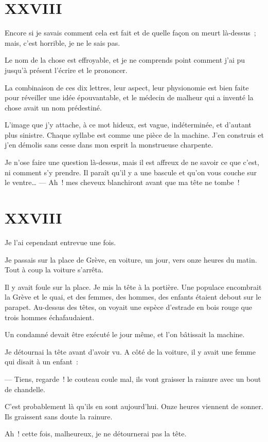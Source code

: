 \documentclass[french,twoside]{book} %
\begin{document}
 \section[{XXVIII}]{XXVIII}
\label{ch27}\renewcommand{\leftmark}{XXVIII}

\noindent Encore si je savais comment cela est fait et de quelle façon on meurt là-dessus ; mais, c’est horrible, je ne le sais pas.\par
Le nom de la chose est effroyable, et je ne comprends point comment j’ai pu jusqu’à présent l’écrire et le prononcer.\par
La combinaison de ces dix lettres, leur aspect, leur physionomie est bien faite pour réveiller une idée épouvantable, et le médecin de malheur qui a inventé la chose avait un nom prédestiné.\par
L’image que j’y attache, à ce mot hideux, est vague, indéterminée, et d’autant plus sinistre. Chaque syllabe est comme une pièce de la machine. J’en construis et j’en démolis sans cesse dans mon esprit la monstrueuse charpente.\par
Je n’ose faire une question là-dessus, mais il est affreux de ne savoir ce que c’est, ni comment s’y prendre. Il paraît qu’il y a une bascule et qu’on vous couche sur le ventre… — Ah ! mes cheveux blanchiront avant que ma tête ne tombe !
 \section[{XXVIII}]{XXVIII}
\label{ch28}\renewcommand{\leftmark}{XXVIII}

\noindent Je l’ai cependant entrevue une fois.\par
Je passais sur la place de Grève, en voiture, un jour, vers onze heures du matin. Tout à coup la voiture s’arrêta.\par
Il y avait foule sur la place. Je mis la tête à la portière. Une populace encombrait la Grève et le quai, et des femmes, des hommes, des enfants étaient debout sur le parapet. Au-dessus des têtes, on voyait une espèce d’estrade en bois rouge que trois hommes échafaudaient.\par
Un condamné devait être exécuté le jour même, et l’on bâtissait la machine.\par
Je détournai la tête avant d’avoir vu. A côté de la voiture, il y avait une femme qui disait à un enfant :\par
— Tiens, regarde ! le couteau coule mal, ils vont graisser la rainure avec un bout de chandelle.\par
C’est probablement là qu’ils en sont aujourd’hui. Onze heures viennent de sonner. Ils graissent sans doute la rainure.\par
Ah ! cette fois, malheureux, je ne détournerai pas la tête.
\end{document}
